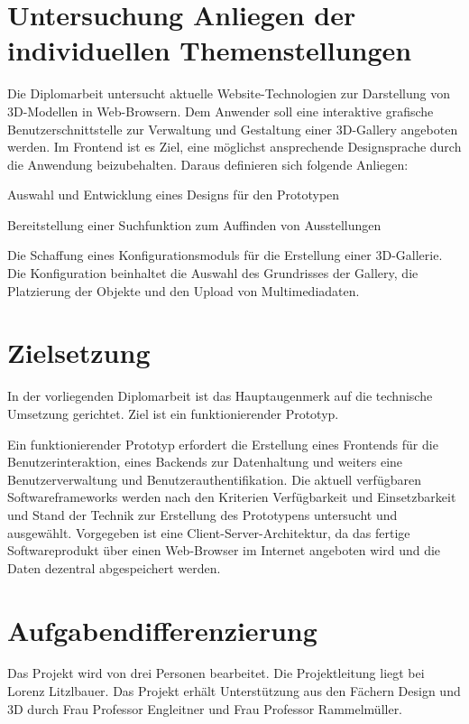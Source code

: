 \section{Untersuchung Anliegen der individuellen Themenstellungen}
Die Diplomarbeit untersucht aktuelle Website-Technologien zur Darstellung von 3D-Modellen in Web-Browsern.
Dem Anwender soll eine interaktive grafische Benutzerschnittstelle zur Verwaltung und Gestaltung einer 3D-Gallery angeboten werden.
Im Frontend ist es Ziel, eine möglichst ansprechende Designsprache durch die Anwendung beizubehalten.
Daraus definieren sich folgende Anliegen:
\begin{compactitem}
    \item Auswahl und Entwicklung eines Designs für den Prototypen
    \item Bereitstellung einer Suchfunktion zum Auffinden von Ausstellungen
    \item Die Schaffung eines Konfigurationsmoduls für die Erstellung einer 3D-Gallerie. Die Konfiguration beinhaltet die Auswahl des Grundrisses der Gallery, die Platzierung der Objekte und den Upload von Multimediadaten.
\end{compactitem}


\section{Zielsetzung}
In der vorliegenden Diplomarbeit ist das Hauptaugenmerk auf die technische Umsetzung gerichtet. Ziel ist ein funktionierender Prototyp.

Ein funktionierender Prototyp erfordert die Erstellung eines Frontends für die Benutzerinteraktion, eines Backends zur Datenhaltung und weiters eine Benutzerverwaltung und Benutzerauthentifikation. Die aktuell verfügbaren Softwareframeworks werden nach den Kriterien Verfügbarkeit und Einsetzbarkeit und Stand der Technik zur Erstellung des Prototypens untersucht und ausgewählt. Vorgegeben ist eine Client-Server-Architektur, da das fertige Softwareprodukt über einen Web-Browser im Internet angeboten wird und die Daten dezentral abgespeichert werden.

\section{Aufgabendifferenzierung}
Das Projekt wird von drei Personen bearbeitet. Die Projektleitung liegt bei Lorenz Litzlbauer. Das Projekt erhält Unterstützung aus den Fächern Design und 3D durch Frau Professor Engleitner und Frau Professor Rammelmüller.

